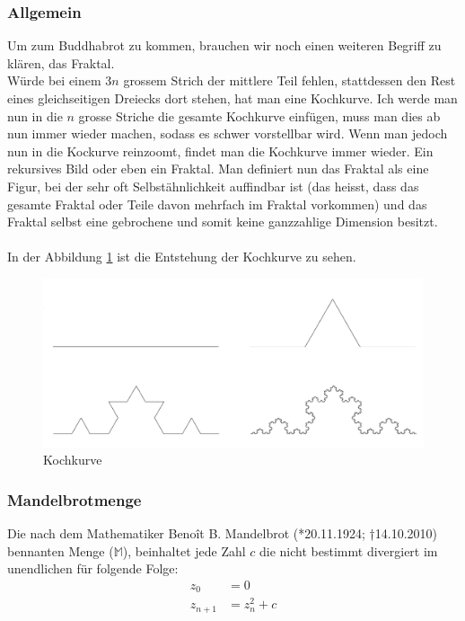 \subsubsection{Allgemein}
Um zum Buddhabrot zu kommen, brauchen wir noch einen weiteren Begriff zu klären, das Fraktal.\\ Würde bei einem 3$n$ grossem Strich der mittlere Teil fehlen, stattdessen den Rest eines gleichseitigen Dreiecks dort stehen, hat man eine Kochkurve. Ich werde man nun in die $n$ grosse Striche die gesamte Kochkurve einfügen, muss man dies ab nun immer wieder machen, sodass es schwer vorstellbar wird. Wenn man jedoch nun in die Kockurve reinzoomt, findet man die Kochkurve immer wieder. Ein rekursives Bild oder eben ein Fraktal. Man definiert nun das Fraktal als eine Figur, bei der sehr oft Selbstähnlichkeit auffindbar ist (das heisst, dass das gesamte Fraktal oder Teile davon mehrfach im Fraktal vorkommen) und das Fraktal selbst eine gebrochene und somit keine ganzzahlige Dimension besitzt.\\
\\
In der Abbildung \ref{fig:Kochkurve} ist die Entstehung der Kochkurve zu sehen.

\begin{figure}[h]
    \centering
    \includegraphics[width=.5\textwidth]{Pictures/Kochkurve.png}
    \caption{Kochkurve}
    \label{fig:Kochkurve}
\end{figure}

\subsubsection{Mandelbrotmenge}
Die nach dem Mathematiker Benoît B. Mandelbrot (*20.11.1924; †14.10.2010) bennanten Menge ($\mathbb{M}$), beinhaltet jede Zahl $c$ die nicht bestimmt divergiert im unendlichen für folgende Folge:
\begin{align*}
z_0&=0\\
z_{n+1}&=z^2_n+c\\
\end{align*}